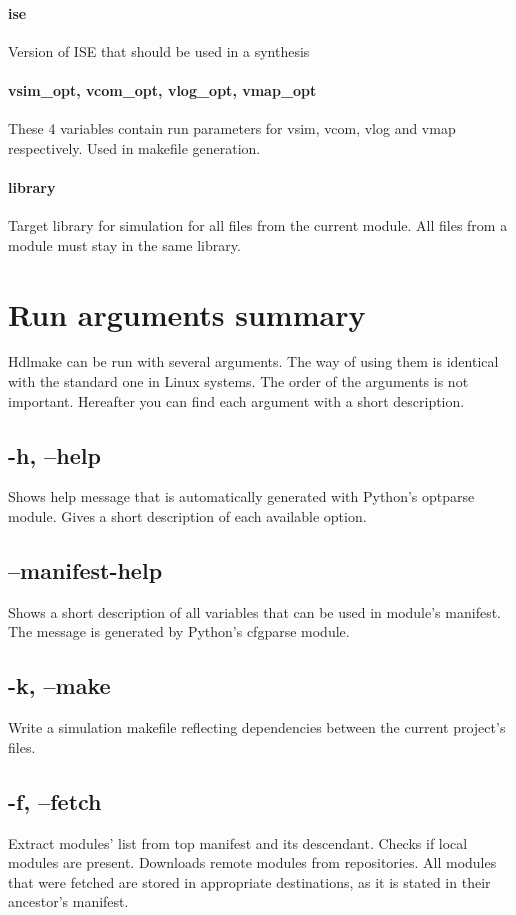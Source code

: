 \documentclass[a4paper,11pt]{article}
\begin{document}
\paragraph*{ise}
Version of ISE that should be used in a synthesis
\paragraph*{vsim\_opt, vcom\_opt, vlog\_opt, vmap\_opt}
These 4 variables contain run parameters for vsim, vcom, vlog and vmap respectively. Used in makefile generation.
\paragraph*{library}
Target library for simulation for all files from the current module. All files from a module must stay in the same library.
\section{Run arguments summary}\label{subsec:args}
Hdlmake can be run with several arguments. The way of using them is identical with the standard one in Linux systems. The order of the arguments is not important. Hereafter you can find each argument with a short description.
\subsection*{-h, --help}
Shows help message that is automatically generated with Python's optparse module. Gives a short description of each available option.
\subsection*{--manifest-help}
Shows a short description of all variables that can be used in module's manifest. The message is generated by Python's cfgparse module.
\subsection*{-k, --make}
Write a simulation makefile reflecting dependencies between the current project's files.
\subsection*{-f, --fetch}
Extract modules' list from top manifest and its descendant. Checks if local modules are present. Downloads remote modules from repositories. All modules that were fetched are stored in appropriate destinations, as it is stated in their ancestor's manifest. 
\end{document}

